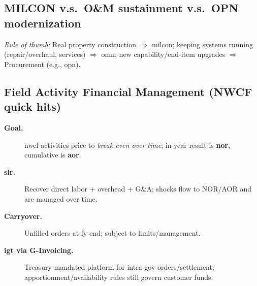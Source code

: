 \documentclass[../main.tex]{subfiles}
\begin{document}
\subsection{MILCON v.s.\ O\&M sustainment v.s.\ OPN modernization}
\emph{Rule of thumb:} Real property construction $\Rightarrow$ \ac{milcon}; keeping systems running (repair/overhaul, services) $\Rightarrow$ \ac{omn}; new capability/end-item upgrades $\Rightarrow$ Procurement (e.g., \ac{opn}).

\subsection{Field Activity Financial Management (NWCF quick hits)}
\begin{description}
  \item[\textbf{Goal.}] \ac{nwcf} activities price to \emph{break even over time}; in-year result is \textbf{\ac{nor}}, cumulative is \textbf{\ac{aor}}.
  \item[\textbf{\ac{slr}.}] Recover direct labor + overhead + G\&A; shocks flow to NOR/AOR and are managed over time.
  \item[\textbf{Carryover.}] Unfilled orders at \ac{fy} end; subject to limits/management.
  \item[\textbf{\ac{igt} via G-Invoicing.}] Treasury-mandated platform for intra-gov orders/settlement; apportionment/availability rules still govern customer funds.
\end{description}
\end{document}
